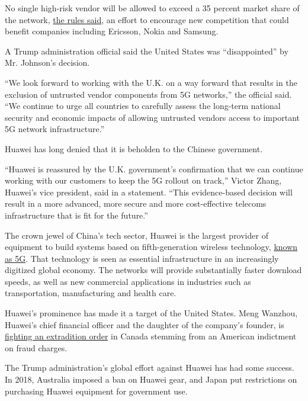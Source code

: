 No single high-risk vendor will be allowed to exceed a 35 percent market
share of the network,
\href{https://www.gov.uk/government/news/new-plans-to-safeguard-countrys-telecoms-network-and-pave-way-for-fast-reliable-and-secure-connectivity}{the
rules said}, an effort to encourage new competition that could benefit
companies including Ericsson, Nokia and Samsung.

A Trump administration official said the United States was
``disappointed'' by Mr. Johnson's decision.

``We look forward to working with the U.K. on a way forward that results
in the exclusion of untrusted vendor components from 5G networks,'' the
official said. ``We continue to urge all countries to carefully assess
the long-term national security and economic impacts of allowing
untrusted vendors access to important 5G network infrastructure.''

Huawei has long denied that it is beholden to the Chinese government.

``Huawei is reassured by the U.K. government's confirmation that we can
continue working with our customers to keep the 5G rollout on track,''
Victor Zhang, Huawei's vice president, said in a statement. ``This
evidence-based decision will result in a more advanced, more secure and
more cost-effective telecoms infrastructure that is fit for the
future.''

The crown jewel of China's tech sector, Huawei is the largest provider
of equipment to build systems based on fifth-generation wireless
technology,
\href{https://www.nytimes.com/2018/12/31/technology/personaltech/5g-what-you-need-to-know.html}{known
as 5G}. That technology is seen as essential infrastructure in an
increasingly digitized global economy. The networks will provide
substantially faster download speeds, as well as new commercial
applications in industries such as transportation, manufacturing and
health care.

Huawei's prominence has made it a target of the United States. Meng
Wanzhou, Huawei's chief financial officer and the daughter of the
company's founder, is
\href{https://www.nytimes.com/2020/01/20/world/canada/meng-wanzhou-huawei-detention-vancouver.html}{fighting
an extradition order} in Canada stemming from an American indictment on
fraud charges.

The Trump administration's global effort against Huawei has had some
success. In 2018, Australia imposed a ban on Huawei gear, and Japan put
restrictions on purchasing Huawei equipment for government use.

